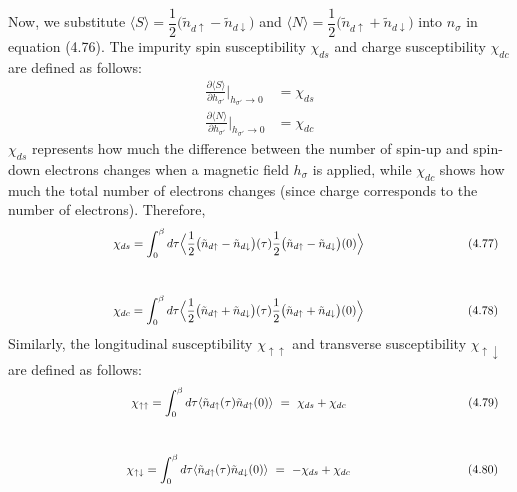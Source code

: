 \documentclass[a4j]{jarticle}
\begin{document}
${}$

Now, we substitute $
	\langle S \rangle
	=
	\dfrac{1}{2}
	\big(
	\tilde{n}_{d \uparrow} - \tilde{n}_{d \downarrow}
	\big)
$
and $
	\langle N \rangle
	=
	\dfrac{1}{2}
	\big(
	\tilde{n}_{d \uparrow} + \tilde{n}_{d \downarrow}
	\big)
$
into $n_{\sigma}$ in equation (4.76).
The impurity spin susceptibility $\chi_{ds}$ and charge susceptibility $\chi_{dc}$ are defined as follows:
\begin{align}
	\frac{
		\partial
		\langle S \rangle
	}{
		\partial
		h_{\sigma'}
	}
	\bigg|_{h_{\sigma'} \to 0}
	 & =
	\chi_{ds}
	\\
	\frac{
		\partial
		\langle N \rangle
	}{
		\partial
		h_{\sigma'}
	}
	\bigg|_{h_{\sigma'} \to 0}
	 & =
	\chi_{dc}
\end{align}
$\chi_{ds}$ represents how much the difference between the number of spin-up and spin-down electrons changes when a magnetic field $h_{\sigma}$ is applied, while $\chi_{dc}$ shows how much the total number of electrons changes (since charge corresponds to the number of electrons).
Therefore,
\begin{align}
	\hspace{30.7mm}
	\chi_{ds}
	 & =
	\int^{\beta}_{0}d \tau
	\Big\langle
	\dfrac{1}{2}
	\big(
	\tilde{n}_{d \uparrow} - \tilde{n}_{d \downarrow}
	\big)(\tau)
	\dfrac{1}{2}
	\big(
	\tilde{n}_{d \uparrow} - \tilde{n}_{d \downarrow}
	\big)(0)
	\Big\rangle
	\nonumber
	\hspace{30.7mm}
	(4.77)
\end{align}
\\[-12mm]
\begin{align}
	\hspace{30.7mm}
	\chi_{dc}
	 & =
	\int^{\beta}_{0}d \tau
	\Big\langle
	\dfrac{1}{2}
	\big(
	\tilde{n}_{d \uparrow} + \tilde{n}_{d \downarrow}
	\big)(\tau)
	\dfrac{1}{2}
	\big(
	\tilde{n}_{d \uparrow} + \tilde{n}_{d \downarrow}
	\big)(0)
	\Big\rangle
	\nonumber
	\hspace{30.7mm}
	(4.78)
\end{align}
Similarly, the longitudinal susceptibility $\chi_{\uparrow \uparrow}$ and transverse susceptibility $\chi_{\uparrow \downarrow}$ are defined as follows:
\begin{align}
	\hspace{36mm}
	\chi_{\uparrow \uparrow}
	 & =
	\int^{\beta}_{0}d \tau
	\langle
	\tilde{n}_{d \uparrow}(\tau)
	\tilde{n}_{d \uparrow}(0)
	\rangle
	\ = \
	\chi_{ds} + \chi_{dc}
	\nonumber
	\hspace{36mm}
	(4.79)
\end{align}
\\[-12mm]
\begin{align}
	\hspace{34.7mm}
	\chi_{\uparrow \downarrow}
	 & =
	\int^{\beta}_{0}d \tau
	\langle
	\tilde{n}_{d \uparrow}(\tau)
	\tilde{n}_{d \downarrow}(0)
	\rangle
	\ = \
	- \chi_{ds} + \chi_{dc}
	\nonumber
	\hspace{34.7mm}
	(4.80)
\end{align}
\end{document}
